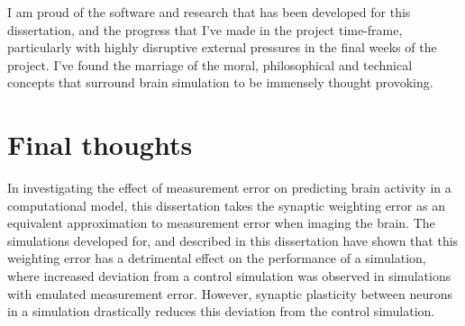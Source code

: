 I am proud of the software and research that has been developed for this
dissertation, and  the progress that I've made in the project time-frame,
particularly with highly disruptive external pressures in the final weeks of the
project. I've found the marriage of the moral, philosophical and technical
concepts that surround brain simulation to be immensely thought provoking.

\section{Final thoughts}

In investigating the effect of measurement error on predicting brain activity in
a computational model, this dissertation takes the synaptic weighting error as
an equivalent approximation to measurement error when imaging the brain. The
simulations developed for, and described in this dissertation have shown that
this weighting error has a detrimental effect on the performance of a
simulation, where increased deviation from a control simulation was observed in
simulations with emulated measurement error. However, synaptic plasticity
between neurons in a simulation drastically reduces this deviation from the
control simulation.







